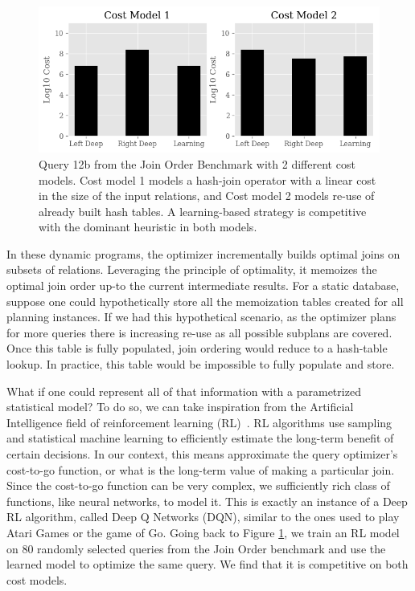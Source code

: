 \begin{figure}
    \centering
    \includegraphics[width=\columnwidth]{figs/teaser.png}
    \caption{\small Query 12b from the Join Order Benchmark with 2 different cost models. Cost model 1 models a hash-join operator with a linear cost in the size of the input relations, and Cost model 2 models re-use of already built hash tables. A learning-based strategy is competitive with the dominant heuristic in both models. \label{teaser}}
\end{figure}

In these dynamic programs, the optimizer incrementally builds optimal joins on subsets of relations.
Leveraging the principle of optimality, it memoizes the optimal join order up-to the current intermediate results.
For a static database, suppose one could hypothetically store all the memoization tables created for all planning instances.
If we had this hypothetical scenario, as the optimizer plans for more queries there is increasing re-use as all possible subplans are covered.
Once this table is fully populated, join ordering would reduce to a hash-table lookup.
In practice, this table would be impossible to fully populate and store.

What if one could represent all of that information with a parametrized statistical model? To do so, we can take inspiration from the Artificial Intelligence field of reinforcement learning (RL)~\cite{sutton1998reinforcement}. RL algorithms use sampling and statistical machine learning to efficiently estimate the long-term benefit of certain decisions.
In our context, this means approximate the query optimizer's cost-to-go function, or what is the long-term value of making a particular join. 
Since the cost-to-go function can be very complex, we sufficiently rich class of functions, like neural networks, to model it.
This is exactly an instance of a Deep RL  algorithm, called Deep Q Networks (DQN), similar to the ones used to play Atari Games or the game of Go.
Going back to Figure \ref{teaser}, we train an RL model on 80 randomly selected queries from the Join Order benchmark and use the learned model to optimize the same query. We find that it is competitive on both cost models.

